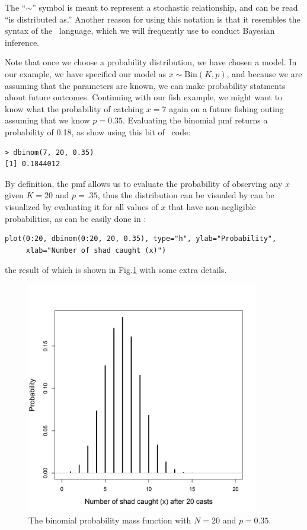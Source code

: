 The ``$\sim$'' symbol is meant to represent a stochastic relationship, and
can be read ``is distributed as.''
Another reason for using this notation is that
it resembles the syntax of the \bugs~language, which we will
frequently use to conduct Bayesian inference.

Note that once we choose a probability distribution, we have chosen a
model. In our example, we have specified our model as $x \sim
\text{Bin}(K,p)$, and because we are assuming that the parameters are
known, we can make probability statments about future
outcomes. Continuing with our fish example, we might want to know what
the probability of catching $x=7$ again on a future fishing outing
assuming that we know $p=0.35$. Evaluating the binomial pmf returns a
probability of 0.18, as show using this bit of \R~code:
\begin{verbatim}
> dbinom(7, 20, 0.35)
[1] 0.1844012
\end{verbatim}
By definition, the pmf allows us to evaluate the probability of observing
any $x$ given $K=20$ and $p=.35$, thus the distribution can be visualed
by can be visualized by evaluating it for all values of $x$ that have
non-negligible probabilities, as can be easily done in \R:
\begin{verbatim}
plot(0:20, dbinom(0:20, 20, 0.35), type="h", ylab="Probability",
     xlab="Number of shad caught (x)")
\end{verbatim}
the result of which is shown in Fig.\ref{modeling.fig.bin} with some extra details.
\begin{figure}[ht!]
  \centering
  \includegraphics[width=4in,height=4in]{Ch1b/figs/bin}
\caption{The binomial probability mass function with $N=20$ and
  $p=0.35$. }
\label{modeling.fig.bin}
\end{figure}

